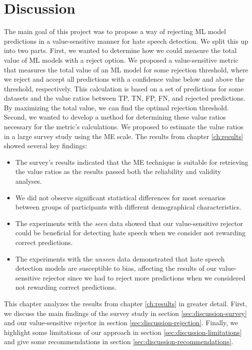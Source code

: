 \chapter{Discussion}
The main goal of this project was to propose a way of rejecting ML model predictions in a value-sensitive manner for hate speech detection.
%
We split this up into two parts.
%
First, we wanted to determine how we could measure the total value of ML models with a reject option.
%
We proposed a value-sensitive metric that measures the total value of an ML model for some rejection threshold, where we reject and accept all predictions with a confidence value below and above the threshold, respectively.
%
This calculation is based on a set of predictions for some datasets and the value ratios between TP, TN, FP, FN, and rejected predictions.
%
By maximizing the total value, we can find the optimal rejection threshold.
%
Second, we wanted to develop a method for determining these value ratios necessary for the metric's calculations.
%
We proposed to estimate the value ratios in a large survey study using the ME scale.
%
The results from chapter \ref{ch:results} showed several key findings:
\begin{itemize}
    \item The survey's results indicated that the ME technique is suitable for retrieving the value ratios as the results passed both the reliability and validity analyses.
    \item We did not observe significant statistical differences for most scenarios between groups of participants with different demographical characteristics.
    \item The experiments with the \emph{seen} data showed that our value-sensitive rejector could be beneficial for detecting hate speech when we consider not rewarding correct predictions.
    \item The experiments with the \emph{unseen} data demonstrated that hate speech detection models are susceptible to bias, affecting the results of our value-sensitive rejector since we had to reject more predictions when we considered not rewarding correct predictions.
\end{itemize}
%

%
This chapter analyzes the results from chapter \ref{ch:results} in greater detail.
%
First, we discuss the main findings of the survey study in section \ref{sec:discussion-survey} and our value-sensitive rejector in section \ref{sec:discussion-rejection}.
%
Finally, we highlight some limitations of our approach in section \ref{sec:discussion-limitations} and give some recommendations in section \ref{sec:discussion-recommendations}.



